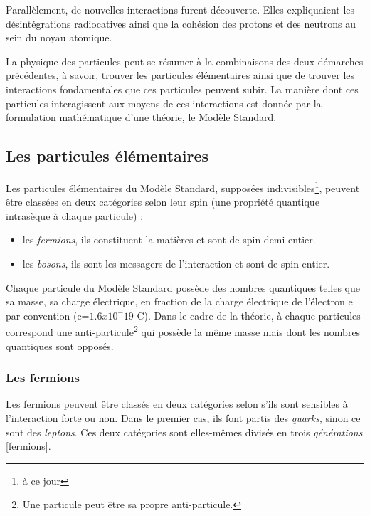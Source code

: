 Parallèlement, de nouvelles interactions furent découverte. Elles expliquaient les désintégrations radiocatives ainsi que la cohésion des protons et des neutrons au sein du noyau atomique.

La physique des particules peut se résumer à la combinaisons des deux démarches précédentes, à savoir, trouver les particules élémentaires ainsi que de trouver les interactions fondamentales que ces particules peuvent subir. La manière dont ces particules interagissent aux moyens de ces interactions est donnée par la formulation mathématique d'une théorie, le Modèle Standard.

\subsection{Les particules élémentaires}
Les particules élémentaires du Modèle Standard, supposées indivisibles\footnote{à ce jour}, peuvent être classées en deux catégories selon leur spin (une propriété quantique intrasèque à chaque particule) :
\begin{itemize}
\item les \textit{fermions}, ils constituent la matières et sont de spin demi-entier.
\item les \textit{bosons}, ils sont les messagers de l'interaction et sont de spin entier.
\end{itemize}
Chaque particule du Modèle Standard possède des nombres quantiques telles que sa masse, sa charge électrique, en fraction de la charge électrique de l'électron e par convention (e=$1.6x10^-19$ C). Dans le cadre de la théorie, à chaque particules correspond une anti-particule\footnote{Une particule peut être sa propre anti-particule.} qui possède la même masse mais dont les nombres quantiques sont opposés.

\subsubsection{Les fermions}
Les fermions peuvent être classés en deux catégories selon s'ils sont sensibles à l'interaction forte ou non. Dans le premier cas, ils font partis des \textit{quarks}, sinon ce sont des \textit{leptons}. Ces deux catégories sont elles-mêmes divisés en trois \textit{générations} \ref{fermions}.

